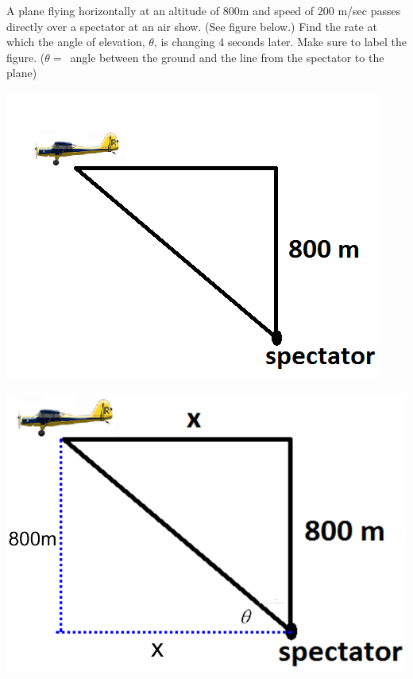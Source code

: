 \documentclass[nooutcomes,handout]{ximera}
\begin{document}
\begin{problem}
A plane flying horizontally at an altitude of 800m and speed of 200 m/sec passes directly over a spectator at an air show. (See figure below.)  Find the rate at which the angle of elevation, $\theta$, is changing 4 seconds later. Make sure to label the figure. ($\theta =$\ angle between the ground and the line from the spectator to the plane)   

	\begin{image}
	\includegraphics[scale=.5]{Figure6.png}
	\end{image}
\begin{freeResponse} \hfil
	\begin{image}
	\includegraphics[scale=.3]{Figure7.png}
	\end{image}


\end{freeResponse}
\end{problem}
\end{document}
